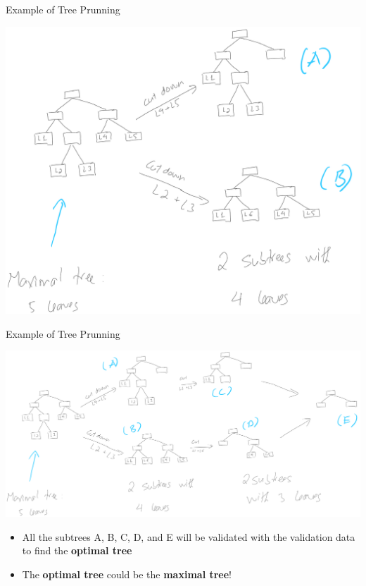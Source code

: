 \documentclass[
  ignorenonframetext,
]{beamer}
\begin{document}
\begin{frame}{Example of Tree Prunning}
\protect\hypertarget{example-of-tree-prunning}{}

\includegraphics{images2/tree8.png}

\end{frame}

\begin{frame}{Example of Tree Prunning}
\protect\hypertarget{example-of-tree-prunning-1}{}

\includegraphics{images2/tree9.png}

\begin{itemize}
\item
  All the subtrees A, B, C, D, and E will be validated with the
  validation data to find the \textbf{optimal tree}
\item
  The \textbf{optimal tree} could be the \textbf{maximal tree}!
\end{itemize}

\end{frame}
\end{document}
